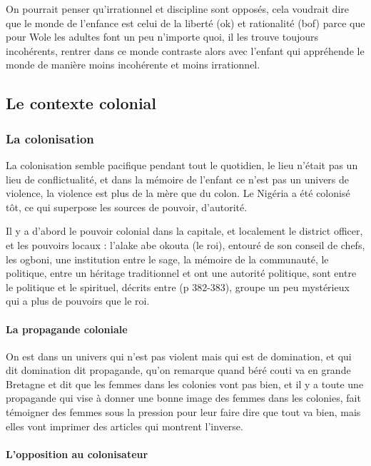 \documentclass[a4paper, 11pt, hidelinks]{article}
\newcommand{\bs}{\bigskip}
\begin{document}
\bs
On pourrait penser qu'irrationnel et discipline sont opposés, cela voudrait dire que le monde de
l'enfance est celui de la liberté (ok) et rationalité (bof) parce que pour Wole les adultes font
un peu n'importe quoi, il les trouve toujours incohérents, rentrer dans ce monde contraste alors
avec l'enfant qui appréhende le monde de manière moins incohérente et moins irrationnel.

\subsection{Le contexte colonial}


\subsubsection{La colonisation}

La colonisation semble pacifique pendant tout le quotidien, le lieu n'était pas un lieu de
conflictualité, et dans la mémoire de l'enfant ce n'est pas un univers de violence, la violence
est plus de la mère que du colon. Le Nigéria a été colonisé tôt, ce qui superpose les sources de
pouvoir, d'autorité.

\bs

Il y a d'abord le pouvoir colonial dans la capitale, et localement le district
officer, et les pouvoirs locaux : l'alake abe okouta (le roi), entouré de son conseil de chefs, les
ogboni, une institution entre le sage, la mémoire de la communauté, le politique, entre un héritage
traditionnel et ont une autorité politique, sont entre le politique et le spirituel, décrits entre
(p 382-383), groupe un peu mystérieux qui a plus de pouvoirs que le roi.



\paragraph{La propagande coloniale}


On est dans un univers qui n'est pas violent mais qui est de domination, et qui dit domination dit
propagande, qu'on remarque quand béré couti va en grande Bretagne et dit que les femmes dans les colonies
vont pas bien, et il y a toute une propagande qui vise à donner une bonne image des femmes dans les
colonies, fait témoigner des femmes sous la pression pour leur faire dire que tout va bien, mais elles
vont imprimer des articles qui montrent l'inverse.



\paragraph{L'opposition au colonisateur}
\end{document}
